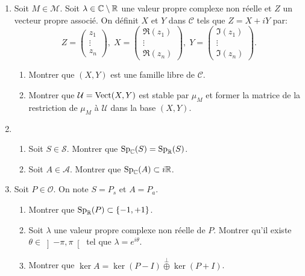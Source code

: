 \begin{enumerate}
 \item Soit $M\in\mathcal{M}$. Soit $\lambda \in \mathbb{C} \setminus \mathbb{R}$ une valeur propre complexe non réelle et $Z$ un vecteur propre associé. On définit $X$ et $Y$ dans $\mathcal{C}$ tels que $Z = X + iY$ par:
\[
 Z = 
\begin{pmatrix}
 z_1 \\ \vdots \\ z_n
\end{pmatrix}, \;
 X = 
\begin{pmatrix}
 \Re(z_1) \\ \vdots \\ \Re(z_n)
\end{pmatrix}, \;
 Y = 
\begin{pmatrix}
 \Im(z_1) \\ \vdots \\ \Im(z_n)
\end{pmatrix}.
\]
\begin{enumerate}
 \item Montrer que $(X,Y)$ est une famille libre de $\mathcal{C}$.
 \item Montrer que $\mathcal{U} = \operatorname{Vect}(X,Y)$ est stable par $\mu_M$ et former la matrice de la restriction de  $\mu_M$ à $\mathcal{U}$ dans la base $(X,Y)$.
\end{enumerate}
\item 
\begin{enumerate}
 \item Soit $S\in \mathcal{S}$. Montrer que $\text{Sp}_{\mathbb{C}}(S) = \text{Sp}_{\mathbb{R}}(S)$.

 \item Soit $A\in \mathcal{A}$. Montrer que $\text{Sp}_{\mathbb{C}}(A) \subset i\mathbb{R}$.
\end{enumerate}

 
 \item Soit $P \in \mathcal{O}$. On note $S = P_s$ et $A = P_a$.
 \begin{enumerate}
  \item Montrer que $\text{Sp}_{\mathbb{R}}(P) \subset \left\lbrace -1, +1 \right\rbrace$. 
  \item Soit $\lambda$ une valeur propre complexe non réelle de $P$. Montrer qu'il existe $\theta \in \left] -\pi , \pi\right[$ tel que $\lambda = e^{i \theta}$. 
  \item Montrer que $\ker A = \ker(P-I) \stackrel{\bot}{\oplus} \ker(P+I)$.
 \end{enumerate}

\end{enumerate}


